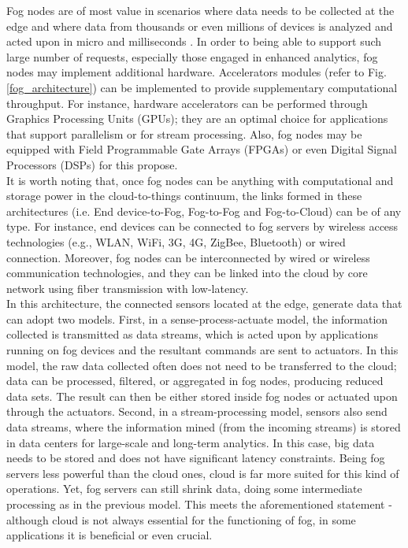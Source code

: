 \noindent\tab Fog nodes are of most value in scenarios where data needs to be collected at the edge and where data from thousands or even millions of devices is analyzed and acted upon in micro and milliseconds \cite{openfog2017openfog}. In order to being able to support such large number of requests, especially those engaged in enhanced analytics, fog nodes may implement additional hardware. Accelerators modules (refer to Fig. \ref{fog_architecture}) can be implemented to provide supplementary computational throughput. For instance, hardware accelerators can be performed through Graphics Processing Units (GPUs); they are an optimal choice for applications that support parallelism or for stream processing. Also, fog nodes may be equipped with Field Programmable Gate Arrays (FPGAs) or even Digital Signal Processors (DSPs) for this propose.\\
\noindent\tab It is worth noting that, once fog nodes can be anything with computational and storage power in the cloud-to-things continuum, the links formed in these architectures (i.e. End device-to-Fog, Fog-to-Fog and Fog-to-Cloud) can be of any type. For instance, end devices can be connected to fog servers by wireless access technologies (e.g., WLAN, WiFi, 3G, 4G, ZigBee, Bluetooth) or wired connection. Moreover, fog nodes can be interconnected by wired or wireless communication technologies, and they can be linked into the cloud by core network using fiber transmission with low-latency.\\
\noindent\tab In this architecture, the connected sensors located at the edge, generate data that can adopt two models. First, in a sense-process-actuate model, the information collected is transmitted as data streams, which is acted upon by applications running on fog devices and the resultant commands are sent to actuators. In this model, the raw data collected often does not need to be transferred to the cloud; data can be processed, filtered, or aggregated in fog nodes, producing reduced data sets. The result can then be either stored inside fog nodes or actuated upon through the actuators. Second, in a stream-processing model, sensors also send data streams, where the information mined (from the incoming streams) is stored in data centers for large-scale and long-term analytics. In this case, big data needs to be stored and does not have significant latency constraints. Being fog servers less powerful than the cloud ones, cloud is far more suited for this kind of operations. Yet, fog servers can still shrink data, doing some intermediate processing as in the previous model. This meets the aforementioned statement - although cloud is not always essential for the functioning of fog, in some applications it is beneficial or even crucial.\\
